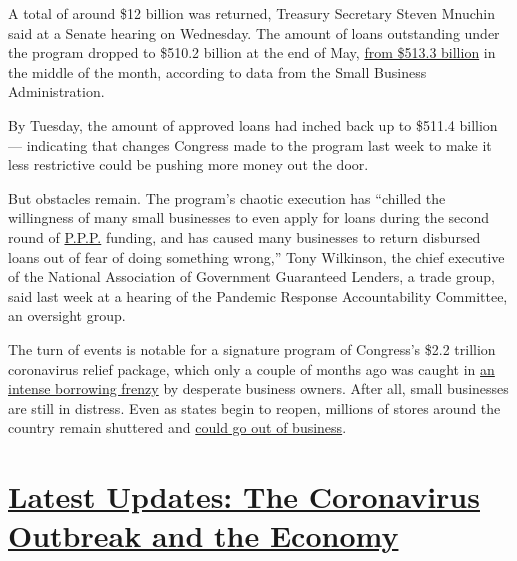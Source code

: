 A total of around \$12 billion was returned, Treasury Secretary Steven
Mnuchin said at a Senate hearing on Wednesday. The amount of loans
outstanding under the program dropped to \$510.2 billion at the end of
May,
\href{https://content.sba.gov/sites/default/files/2020-05/PPP_Report_Net_200518_0.pdf}{from
\$513.3 billion} in the middle of the month, according to data from the
Small Business Administration.

By Tuesday, the amount of approved loans had inched back up to \$511.4
billion --- indicating that changes Congress made to the program last
week to make it less restrictive could be pushing more money out the
door.

But obstacles remain. The program's chaotic execution has ``chilled the
willingness of many small businesses to even apply for loans during the
second round of
\href{https://www.nytimes3xbfgragh.onion/2020/06/30/business/paycheck-protection-program-coronavirus.html}{P.P.P.}
funding, and has caused many businesses to return disbursed loans out of
fear of doing something wrong,'' Tony Wilkinson, the chief executive of
the National Association of Government Guaranteed Lenders, a trade
group, said last week at a hearing of the Pandemic Response
Accountability Committee, an oversight group.

The turn of events is notable for a signature program of Congress's
\$2.2 trillion coronavirus relief package, which only a couple of months
ago was caught in
\href{https://www.nytimes3xbfgragh.onion/2020/04/16/business/coronavirus-sba-loans-out-of-money.html}{an
intense borrowing frenzy} by desperate business owners. After all, small
businesses are still in distress. Even as states begin to reopen,
millions of stores around the country remain shuttered and
\href{https://www.nytimes3xbfgragh.onion/article/small-business-bankruptcy-coronavirus.html}{could
go out of business}.

\hypertarget{latest-updates-the-coronavirus-outbreak-and-the-economy}{%
\section{\texorpdfstring{\href{https://www.nytimes3xbfgragh.onion/live/2020/08/20/business/stock-market-today-coronavirus?action=click\&pgtype=Article\&state=default\&region=MAIN_CONTENT_1\&context=storylines_live_updates}{Latest
Updates: The Coronavirus Outbreak and the
Economy}}{Latest Updates: The Coronavirus Outbreak and the Economy}}\label{latest-updates-the-coronavirus-outbreak-and-the-economy}}


